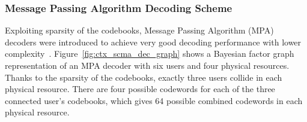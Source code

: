 \subsubsection{Message Passing Algorithm Decoding Scheme}
\label{sec:ctx_scma_detection}

Exploiting sparsity of the codebooks, Message Passing Algorithm (MPA)
decoders were introduced to achieve very good decoding performance with lower
complexity~\cite{Zhang2014a}. Figure~\ref{fig:ctx_scma_dec_graph} shows a
Bayesian factor graph representation of an MPA decoder with six users and four
physical resources. Thanks to the sparsity of the codebooks, exactly three users
collide in each physical resource. There are four possible codewords for each of
the three connected user's codebooks, which gives 64 possible combined codewords
in each physical resource.

